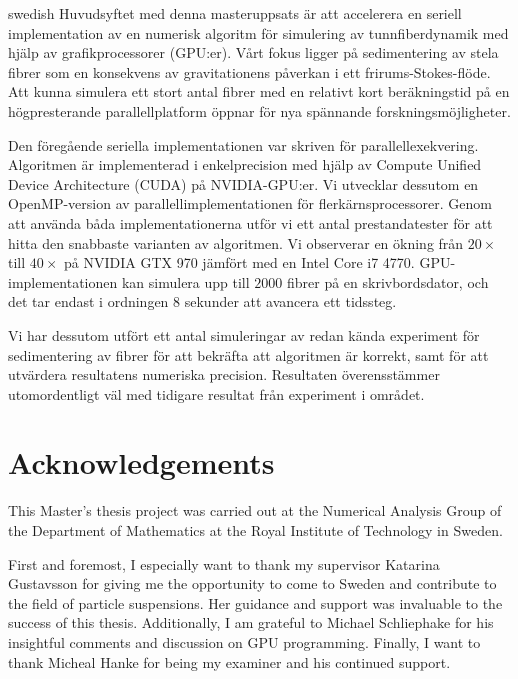 \documentclass[a4paper,11pt]{kth-mag}
\begin{document}
\begin{foreignabstract}{swedish}
Huvudsyftet med denna masteruppsats är att accelerera en seriell implementation av en numerisk algoritm för simulering av tunnfiberdynamik med hjälp av grafikprocessorer (GPU:er). Vårt fokus ligger på sedimentering av stela fibrer som en konsekvens av gravitationens påverkan i ett frirums-Stokes-flöde. Att kunna simulera ett stort antal fibrer med en relativt kort beräkningstid på en högpresterande parallellplatform öppnar för nya spännande forskningsmöjligheter. 

Den föregående seriella implementationen var skriven för parallellexekvering. Algoritmen är implementerad i enkelprecision med hjälp av Compute Unified Device Architecture (CUDA) på NVIDIA-GPU:er. Vi utvecklar dessutom en OpenMP-version av parallellimplementationen för flerkärnsprocessorer. Genom att använda båda implementationerna utför vi ett antal prestandatester för att hitta den snabbaste varianten av algoritmen. Vi observerar en ökning från $20×$ till $40×$ på NVIDIA GTX 970 jämfört med en Intel Core i7 4770. GPU-implementationen kan simulera upp till $2000$ fibrer på en skrivbordsdator, och det tar endast i ordningen $8$ sekunder att avancera ett tidssteg. 

Vi har dessutom utfört ett antal simuleringar av redan kända experiment för sedimentering av fibrer för att bekräfta att algoritmen är korrekt, samt för att utvärdera resultatens numeriska precision. Resultaten överensstämmer utomordentligt väl med tidigare resultat från experiment i området. 
\end{foreignabstract}
\clearpage

\section*{Acknowledgements}
This Master's thesis project was carried out at the Numerical Analysis Group of the Department of Mathematics at the Royal Institute of Technology in Sweden.

First and foremost, I especially want to thank my supervisor Katarina Gustavsson for giving me the opportunity to come to Sweden and contribute to the field of particle suspensions. Her guidance and support was invaluable to the success of this thesis. Additionally, I am grateful to Michael Schliephake for his insightful comments and discussion on GPU programming. Finally, I want to thank Micheal Hanke for being my examiner and his continued support.
\clearpage
\end{document}
